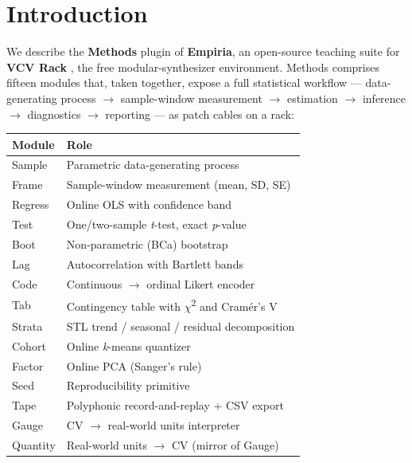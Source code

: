 \section{Introduction}\label{sec-intro}

We describe the \textbf{Methods} plugin of \textbf{Empiria}, an
open-source teaching suite for \textbf{VCV Rack} \citep{vcv-rack}, the
free modular-synthesizer environment. Methods comprises fifteen modules
that, taken together, expose a full statistical workflow ---
data-generating process $\rightarrow$ sample-window measurement $\rightarrow$ estimation $\rightarrow$
inference $\rightarrow$ diagnostics $\rightarrow$ reporting --- as patch cables on a rack:

\begin{longtable}[]{@{}ll@{}}
\toprule\noalign{}
Module & Role \\
\midrule\noalign{}
\endhead
\bottomrule\noalign{}
\endlastfoot
Sample & Parametric data-generating process \\
Frame & Sample-window measurement (mean, SD, SE) \\
Regress & Online OLS with confidence band \\
Test & One/two-sample \emph{t}-test, exact \emph{p}-value \\
Boot & Non-parametric (BCa) bootstrap \citep{efron1987} \\
Lag & Autocorrelation with Bartlett bands \\
Code & Continuous $\rightarrow$ ordinal Likert encoder \\
Tab & Contingency table with \ensuremath{\chi}\textsuperscript{2} and Cramér's V \\
Strata & STL trend / seasonal / residual decomposition \\
Cohort & Online \emph{k}-means quantizer \\
Factor & Online PCA (Sanger's rule) \citep{sanger1989} \\
Seed & Reproducibility primitive \\
Tape & Polyphonic record-and-replay + CSV export \\
Gauge & CV $\rightarrow$ real-world units interpreter \\
Quantity & Real-world units $\rightarrow$ CV (mirror of Gauge) \\
\end{longtable}


